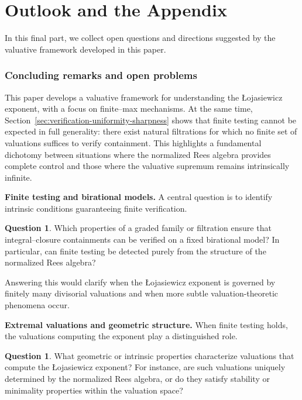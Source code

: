 \documentclass[12pt]{amsart}
\theoremstyle{plain}
\theoremstyle{definition}
\newtheorem{question}[theorem]{Question}
\numberwithin{equation}{section}
\begin{document}

\part{Outlook and the Appendix} \label{part:outlook}

In this final part, we collect open questions and directions suggested by the
valuative framework developed in this paper.


\section{Concluding remarks and open problems}

This paper develops a valuative framework for understanding the \L{}ojasiewicz exponent, with a focus on finite--max mechanisms.
At the same time, Section~\ref{sec:verification-uniformity-sharpness} shows that finite
testing cannot be expected in full generality: there exist natural filtrations for which no
finite set of valuations suffices to verify containment.  This highlights a fundamental
dichotomy between situations where the normalized Rees algebra provides complete control and
those where the valuative supremum remains intrinsically infinite.

\medskip

\noindent
\textbf{Finite testing and birational models.}
A central question is to identify intrinsic conditions guaranteeing finite verification.

\begin{question}
	Which properties of a graded family or filtration ensure that integral--closure containments
	can be verified on a fixed birational model?  In particular, can finite testing be detected
	purely from the structure of the normalized Rees algebra?
\end{question}

Answering this would clarify when the \L{}ojasiewicz exponent is governed by finitely many
divisorial valuations and when more subtle valuation-theoretic phenomena occur.

\medskip

\noindent
\textbf{Extremal valuations and geometric structure.}
When finite testing holds, the valuations computing the exponent play a distinguished role.

\begin{question}
	What geometric or intrinsic properties characterize valuations that compute the
	\L{}ojasiewicz exponent?  For instance, are such valuations uniquely determined by the
	normalized Rees algebra, or do they satisfy stability or minimality properties within the
	valuation space?
\end{question}
\end{document}
